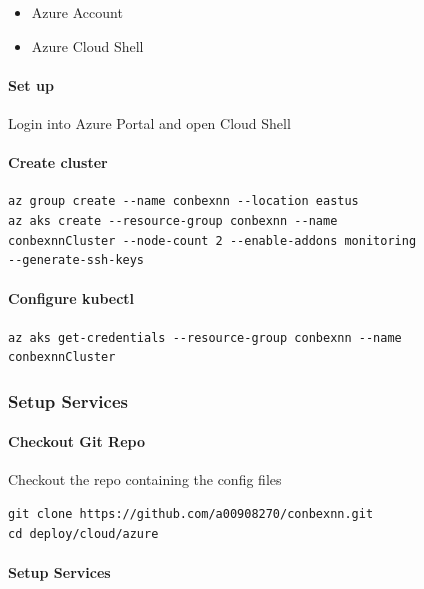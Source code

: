 \begin{itemize}
\tightlist
\item
  Azure Account
\item
  Azure Cloud Shell
\end{itemize}

\paragraph{Set up}\label{set-up}

Login into Azure Portal and open Cloud Shell

\paragraph{Create cluster}\label{create-cluster-2}

\begin{verbatim}
az group create --name conbexnn --location eastus
az aks create --resource-group conbexnn --name 
conbexnnCluster --node-count 2 --enable-addons monitoring
--generate-ssh-keys
\end{verbatim}

\paragraph{Configure kubectl}\label{configure-kubectl}

\begin{verbatim}
az aks get-credentials --resource-group conbexnn --name conbexnnCluster
\end{verbatim}

\subsubsection{Setup Services}\label{setup-services}

\paragraph{Checkout Git Repo}\label{checkout-git-repo}

Checkout the repo containing the config files

\begin{verbatim}
git clone https://github.com/a00908270/conbexnn.git
cd deploy/cloud/azure 
\end{verbatim}

\paragraph{Setup Services}\label{setup-services-1}


